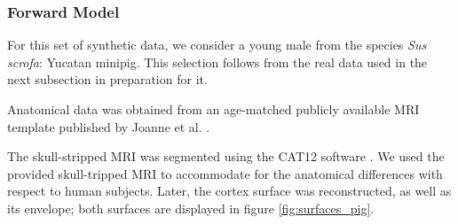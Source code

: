 \subsubsection{Forward Model}

For this set of synthetic data, we consider a young male from the species \textit{Sus scrofa}: Yucatan minipig.
%
This selection follows from the real data used in the next subsection in preparation for it.

Anatomical data was obtained from an age-matched publicly available MRI template published by Joanne et al. \cite{pig_template}.

The skull-stripped MRI was segmented using 
the CAT12 software \cite{gaser2022cat}.
%
We used the provided skull-tripped MRI to accommodate for the anatomical differences with respect to human subjects.
%
Later, the cortex surface was reconstructed, as well as its envelope; both surfaces are displayed in figure \ref{fig:surfaces_pig}.

